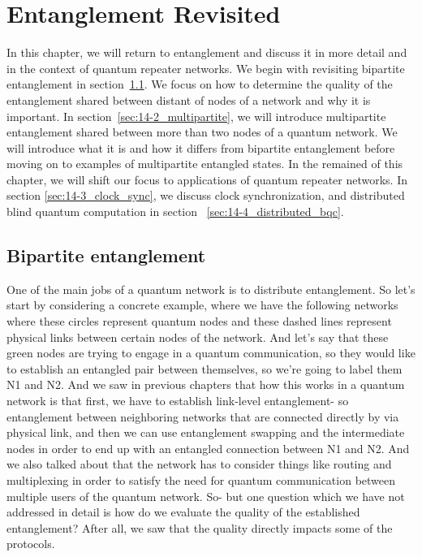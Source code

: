 \chapter{Entanglement Revisited}

In this chapter, we will return to entanglement and discuss it in more detail and in the context of quantum repeater networks.
We begin with revisiting bipartite entanglement in section~\ref{sec:14-1_bipartite}.
We focus on how to determine the quality of the entanglement shared between distant of nodes of a network and why it is important.
In section~\ref{sec:14-2_multipartite}, we will introduce multipartite entanglement shared between more than two nodes of a quantum network.
We will introduce what it is and how it differs from bipartite entanglement before moving on to examples of multipartite entangled states.
In the remained of this chapter, we will shift our focus to applications of quantum repeater networks.
In section \ref{sec:14-3_clock_sync}, we discuss clock synchronization, and distributed blind quantum computation in section ~\ref{sec:14-4_distributed_bqc}.



\section{Bipartite entanglement}
\label{sec:14-1_bipartite}

One of the main jobs of a quantum network is to distribute entanglement.
So let's start by considering a concrete example, where we have the following networks where these circles represent quantum nodes and these dashed lines represent physical links between certain nodes of the network. And let's say that these green nodes are trying to engage in a quantum communication, so they would like to establish an entangled pair between themselves, so we're going to label them N1 and N2. And we saw in previous chapters that how this works in a quantum network is that first, we have to establish link-level entanglement- so entanglement between neighboring networks that are connected directly by via physical link, and then we can use entanglement swapping and the intermediate nodes in order to end up with an entangled connection between N1 and N2. And we also talked about that the network has to consider things like routing and multiplexing in order to satisfy the need for quantum communication between multiple users of the quantum network. So- but one question which we have not addressed in detail is how do we evaluate the quality of the established entanglement? After all, we saw that the quality directly impacts some of the protocols.


